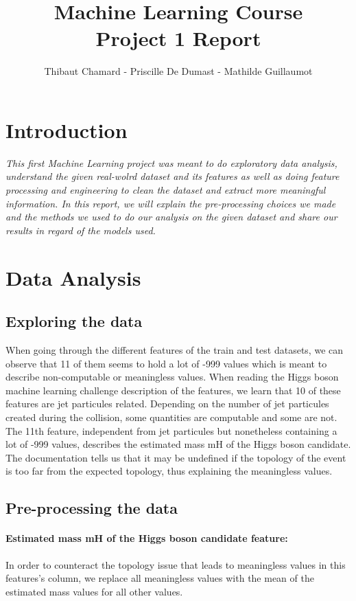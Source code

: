 \documentclass[twocolumn,10pt]{article}
\title{Machine Learning Course \protect\\ Project 1 Report}
\author{Thibaut Chamard - Priscille De Dumast - Mathilde Guillaumot}
\begin{document}
\maketitle

\section*{Introduction}
{\it This first Machine Learning project was meant to do exploratory data analysis, understand the given real-wolrd dataset and its features as well as doing feature processing and engineering to clean the dataset and extract more meaningful information. In this report, we will explain the pre-processing choices we made and the methods we used to do our analysis on the given dataset and share our results in regard of the models used.}


\section{Data Analysis}
\subsection{Exploring the data}
When going through the different features of the train and test datasets, we can observe that 11 of them seems to hold a lot of -999 values which is meant to describe non-computable or meaningless values. When reading the Higgs boson machine learning challenge description of the features, we learn that 10 of these features are jet particules related. Depending on the number of jet particules created during the collision, some quantities are computable and some are not. The 11th feature, independent from jet particules but nonetheless containing a lot of -999 values, describes the estimated mass mH of the Higgs boson candidate. The documentation tells us that it may be undefined if the topology of the event is too far from the expected topology, thus explaining the meaningless values. 

\subsection{Pre-processing the data}
\paragraph*{Estimated mass mH of the Higgs boson candidate feature:}
In order to counteract the topology issue that leads to meaningless values in this features's column, we replace all meaningless values with the mean of the estimated mass values for all other values. 
\end{document}
